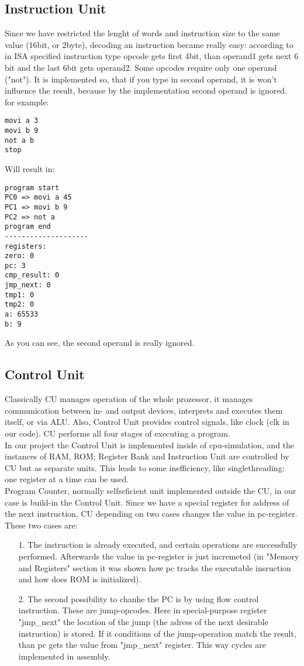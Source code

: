 \documentclass[11pt,a4paper]{article}
\begin{document}
\subsection{Instruction Unit}
Since we have restricted the lenght of words and instruction size to the same value (16bit, or 2byte), decoding an instruction became really easy:
according to in ISA specified instruction type opcode gets first 4bit, than operand1 gets next 6 bit and the last 6bit gets operand2. Some opcodes require only one operand ("not"). It is implemented so, that if you type in second operand, it is won't influence the result, because by the implementation second operand is ignored.
for example:
\begin{verbatim}
movi a 3
movi b 9
not a b
stop
\end{verbatim}
Will result in:
\begin{verbatim}
program start
PC0 => movi a 45
PC1 => movi b 9
PC2 => not a
program end
--------------------
registers:
zero: 0
pc: 3
cmp_result: 0
jmp_next: 0
tmp1: 0
tmp2: 0
a: 65533
b: 9
\end{verbatim}
As you can see, the second operand is really ignored.\\

\newpage
\subsection{Control Unit}
Classically CU manages operation of the whole prozessor, it manages communication between in- and output devices, interprets and executes them itself, or via ALU. Also, Control Unit provides control signals, like clock (clk in our code). CU performs all four stages of executing a program.\\
In our project the Control Unit is implemented inside of cpu-simulation, and the instances of RAM, ROM; Register Bank and Instruction Unit are controlled by CU but as separate units. This leads to some inefficiency, like singlethreading: one register at a time can be used.\\
Program Counter, normally selfseficient unit implemented outside the CU, in our case is build-in the Control Unit. Since we have a special register for address of the next instruction, CU depending on two cases changes the value in pc-register. These two cases are:
\begin{enumerate}
	\item[1.] The instruction is already executed, and certain operations are successfully performed. Afterwards the value in pc-register is just incremeted (in "Memory and Registers" section it was shown how pc tracks the executable insruction and how does ROM is initialized). 
	\item[2.] The second possibility to chanhe the PC is by using flow control instruction. These are jump-opcodes. Here in special-purpose register "jmp\_next" the location of the jump (the adress of the next desirable instruction) is stored. If it conditions of the jump-operation match the result, than pc gets the value from "jmp\_next" register. This way cycles are implemented in assembly.
\end{enumerate} 
\end{document}

